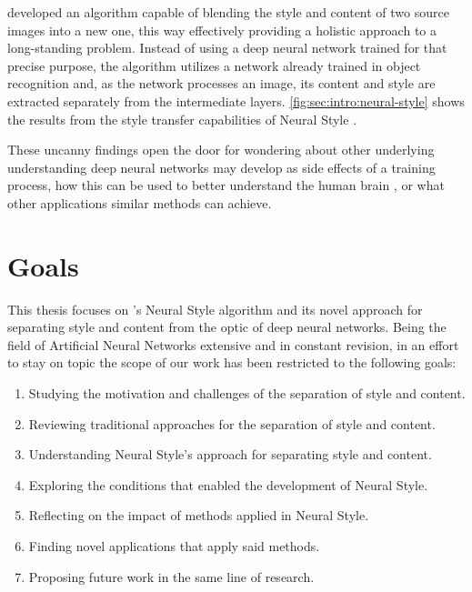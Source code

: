 \citeauthor{Gatys2015B} developed an algorithm capable of blending the style and content of two source images into a new one, this way effectively providing a holistic approach to a long-standing problem.
Instead of using a deep neural network trained for that precise purpose, the algorithm utilizes a network already trained in object recognition and, as the network processes an image, its content and style are extracted separately from the intermediate layers.
\autoref{fig:sec:intro:neural-style} shows the results from the style transfer capabilities of Neural Style \cite{Gatys2015B}.

These uncanny findings open the door for wondering about other underlying understanding deep neural networks may develop as side effects of a training process, how this can be used to better understand the human brain \cite{Yamins2016}, or what other applications similar methods can achieve.



\section{Goals}
\label{sec:intro:goals}

This thesis focuses on \citeauthor{Gatys2015B}'s Neural Style algorithm \cite{Gatys2015B} and its novel approach for separating style and content from the optic of deep neural networks.
Being the field of Artificial Neural Networks extensive and in constant revision, in an effort to stay on topic the scope of our work has been restricted to the following goals:

\begin{enumerate}
  \item Studying the motivation and challenges of the separation of style and content.
  \item Reviewing traditional approaches for the separation of style and content.
  \item Understanding Neural Style's approach for separating style and content.
  \item Exploring the conditions that enabled the development of Neural Style.
  \item Reflecting on the impact of methods applied in Neural Style.
  \item Finding novel applications that apply said methods.
  \item Proposing future work in the same line of research.
\end{enumerate}



